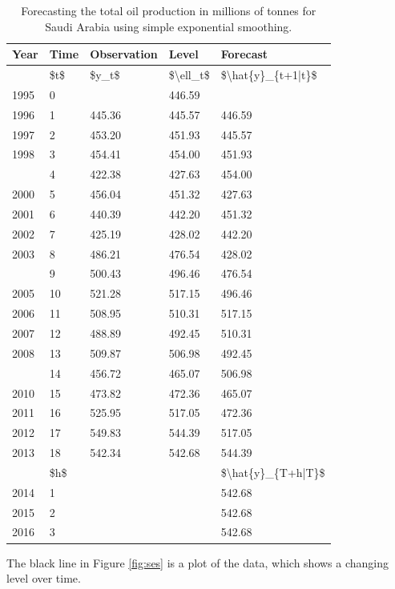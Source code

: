 \documentclass[]{book}
\begin{document}
\begin{table}[t]

\caption{\label{tab:oilses}Forecasting the total oil production in millions of tonnes for Saudi Arabia using simple exponential smoothing.}
\centering
\begin{tabular}{lllll}
\toprule
Year & Time & Observation & Level & Forecast\\
\midrule
 & \$t\$ & \$y\_t\$ & \$\textbackslash{}ell\_t\$ & \$\textbackslash{}hat\{y\}\_\{t+1|t\}\$\\
1995 & 0 &  & 446.59 & \\
1996 & 1 & 445.36 & 445.57 & 446.59\\
1997 & 2 & 453.20 & 451.93 & 445.57\\
1998 & 3 & 454.41 & 454.00 & 451.93\\
\addlinespace
1999 & 4 & 422.38 & 427.63 & 454.00\\
2000 & 5 & 456.04 & 451.32 & 427.63\\
2001 & 6 & 440.39 & 442.20 & 451.32\\
2002 & 7 & 425.19 & 428.02 & 442.20\\
2003 & 8 & 486.21 & 476.54 & 428.02\\
\addlinespace
2004 & 9 & 500.43 & 496.46 & 476.54\\
2005 & 10 & 521.28 & 517.15 & 496.46\\
2006 & 11 & 508.95 & 510.31 & 517.15\\
2007 & 12 & 488.89 & 492.45 & 510.31\\
2008 & 13 & 509.87 & 506.98 & 492.45\\
\addlinespace
2009 & 14 & 456.72 & 465.07 & 506.98\\
2010 & 15 & 473.82 & 472.36 & 465.07\\
2011 & 16 & 525.95 & 517.05 & 472.36\\
2012 & 17 & 549.83 & 544.39 & 517.05\\
2013 & 18 & 542.34 & 542.68 & 544.39\\
\addlinespace
 & \$h\$ &  &  & \$\textbackslash{}hat\{y\}\_\{T+h|T\}\$\\
2014 & 1 &  &  & 542.68\\
2015 & 2 &  &  & 542.68\\
2016 & 3 &  &  & 542.68\\
\bottomrule
\end{tabular}
\end{table}

The black line in Figure \ref{fig:ses} is a plot of the data, which shows a changing level over time.
\end{document}
